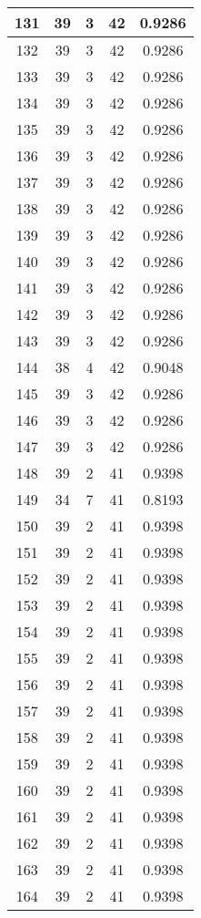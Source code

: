 \documentclass[letterpaper, 12pt]{article}
\begin{document}
\begin{longtable}{|c|c|c|c|c|}
\hline
131 & 39 & 3 & 42 & 0.9286 \\
\hline
132 & 39 & 3 & 42 & 0.9286 \\
\hline
133 & 39 & 3 & 42 & 0.9286 \\
\hline
134 & 39 & 3 & 42 & 0.9286 \\
\hline
135 & 39 & 3 & 42 & 0.9286 \\
\hline
136 & 39 & 3 & 42 & 0.9286 \\
\hline
137 & 39 & 3 & 42 & 0.9286 \\
\hline
138 & 39 & 3 & 42 & 0.9286 \\
\hline
139 & 39 & 3 & 42 & 0.9286 \\
\hline
140 & 39 & 3 & 42 & 0.9286 \\
\hline
141 & 39 & 3 & 42 & 0.9286 \\
\hline
142 & 39 & 3 & 42 & 0.9286 \\
\hline
143 & 39 & 3 & 42 & 0.9286 \\
\hline
144 & 38 & 4 & 42 & 0.9048 \\
\hline
145 & 39 & 3 & 42 & 0.9286 \\
\hline
146 & 39 & 3 & 42 & 0.9286 \\
\hline
147 & 39 & 3 & 42 & 0.9286 \\
\hline
148 & 39 & 2 & 41 & 0.9398 \\
\hline
149 & 34 & 7 & 41 & 0.8193 \\
\hline
150 & 39 & 2 & 41 & 0.9398 \\
\hline
151 & 39 & 2 & 41 & 0.9398 \\
\hline
152 & 39 & 2 & 41 & 0.9398 \\
\hline
153 & 39 & 2 & 41 & 0.9398 \\
\hline
154 & 39 & 2 & 41 & 0.9398 \\
\hline
155 & 39 & 2 & 41 & 0.9398 \\
\hline
156 & 39 & 2 & 41 & 0.9398 \\
\hline
157 & 39 & 2 & 41 & 0.9398 \\
\hline
158 & 39 & 2 & 41 & 0.9398 \\
\hline
159 & 39 & 2 & 41 & 0.9398 \\
\hline
160 & 39 & 2 & 41 & 0.9398 \\
\hline
161 & 39 & 2 & 41 & 0.9398 \\
\hline
162 & 39 & 2 & 41 & 0.9398 \\
\hline
163 & 39 & 2 & 41 & 0.9398 \\
\hline
164 & 39 & 2 & 41 & 0.9398 \\

\end{longtable}
\end{document}
